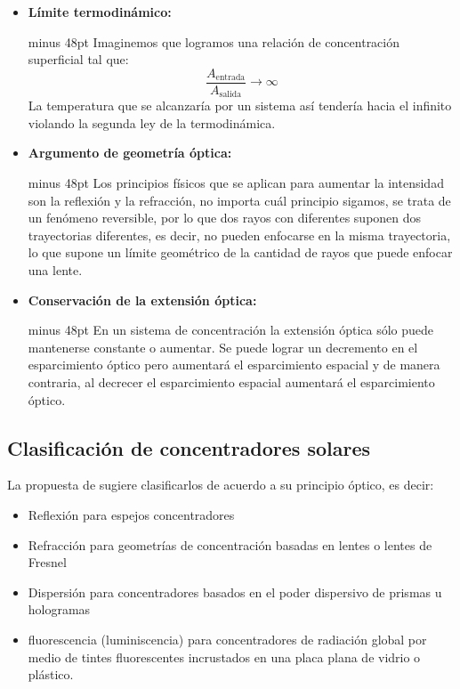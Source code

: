 		\begin{itemize}
			\item \textbf{Límite termodinámico:}\par
				\begin{rightbox}{\linewidth minus 48pt}
					Imaginemos que logramos una relación de concentración superficial tal que:
					\begin{equation*}
						\dfrac{A_{\text{entrada}}}{A_{\text{salida}}} \rightarrow \infty
					\end{equation*}
					La temperatura que se alcanzaría por un sistema así tendería hacia el infinito violando la segunda ley de la termodinámica.
				\end{rightbox}
			\item \textbf{Argumento de geometría óptica:}
				\begin{rightbox}{\linewidth minus 48pt}
					Los principios físicos que se aplican para aumentar la intensidad son la reflexión y la refracción, no importa cuál principio sigamos, se trata de un fenómeno reversible, por lo que dos rayos con diferentes suponen dos trayectorias diferentes, es decir, no pueden enfocarse en la misma trayectoria, lo que supone un límite geométrico de la cantidad de rayos que puede enfocar una lente.
				\end{rightbox}
			\item \textbf{Conservación de la extensión óptica:}
				\begin{rightbox}{\linewidth minus 48pt}
					En un sistema de concentración la extensión óptica sólo puede mantenerse constante o aumentar. Se puede lograr un decremento en el esparcimiento óptico pero aumentará el esparcimiento espacial y de manera contraria, al decrecer el esparcimiento espacial aumentará el esparcimiento óptico.
				\end{rightbox}
		\end{itemize}
		
	\subsection{Clasificación de concentradores solares}
	
		La propuesta de \cite{leutz_nonimaging_2001} sugiere clasificarlos de acuerdo a su principio óptico, es decir:

		\begin{itemize}
			\item Reflexión para espejos concentradores
			\item Refracción para geometrías de concentración basadas en lentes o lentes de Fresnel
			\item Dispersión para concentradores basados en el poder dispersivo de prismas u hologramas
			\item \Gls{fluorescencia} (\gls{luminiscencia}) para concentradores de radiación global por medio de tintes fluorescentes incrustados en una placa plana de vidrio o plástico.
		\end{itemize}

